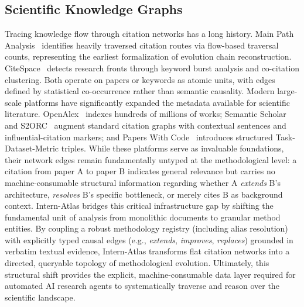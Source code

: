 \documentclass{opendatalab}
\begin{document}
\subsection{Scientific Knowledge Graphs}
Tracing knowledge flow through citation networks has a long history. Main Path Analysis~\cite{hummon1989connectivity} identifies heavily traversed citation routes via flow-based traversal counts, representing the earliest formalization of evolution chain reconstruction. CiteSpace~\cite{chen2006citespace} detects research fronts through keyword burst analysis and co-citation clustering. Both operate on papers or keywords as atomic units, with edges defined by statistical co-occurrence rather than semantic causality.
Modern large-scale platforms have significantly expanded the metadata available for scientific literature. OpenAlex~\cite{priem2022openalex} indexes hundreds of millions of works; Semantic Scholar~\cite{ammar2018construction} and S2ORC~\cite{lo2020s2orc} augment standard citation graphs with contextual sentences and influential-citation markers; and Papers With Code~\cite{nanoresearch2026} introduces structured Task-Dataset-Metric triples. While these platforms serve as invaluable foundations, their network edges remain fundamentally untyped at the methodological level: a citation from paper A to paper B indicates general relevance but carries no machine-consumable structural information regarding whether A \textit{extends} B's architecture, \textit{resolves} B's specific bottleneck, or merely cites B as background context.
{Intern-Atlas} bridges this critical infrastructure gap by shifting the fundamental unit of analysis from monolithic documents to granular method entities. By coupling a robust methodology registry (including alias resolution) with explicitly typed causal edges (e.g., \textit{extends}, \textit{improves}, \textit{replaces}) grounded in verbatim textual evidence, Intern-Atlas transforms flat citation networks into a directed, queryable topology of methodological evolution. Ultimately, this structural shift provides the explicit, machine-consumable data layer required for automated AI research agents to systematically traverse and reason over the scientific landscape.
\end{document}
